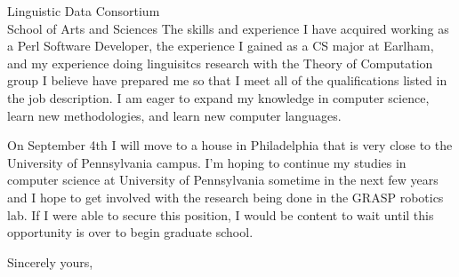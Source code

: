 \documentclass{letter} %
\begin{document}
\begin{letter}{Linguistic Data Consortium \\
School of Arts and Sciences }
\noindent The skills and experience I have acquired working as a Perl Software Developer, the experience I gained as a CS major at Earlham, and my experience doing linguisitcs research with the Theory of Computation group I believe have prepared me so that I meet all of the qualifications listed in the job description.
 I am eager to expand my knowledge in computer science, learn new methodologies, and learn new computer languages.

 \noindent On September 4th I will move to a house in Philadelphia that is very close to the University of Pennsylvania campus.
 I'm hoping to continue my studies in computer science at University of Pennsylvania sometime in the next few years and I hope to get involved with the research being done in the GRASP robotics lab.
 If I were able to secure this position, I would be content to wait until this opportunity is over to begin graduate school. 
 
\closing{Sincerely yours,} 
 

 
\encl{}					%

\end{letter}
 
\end{document}
